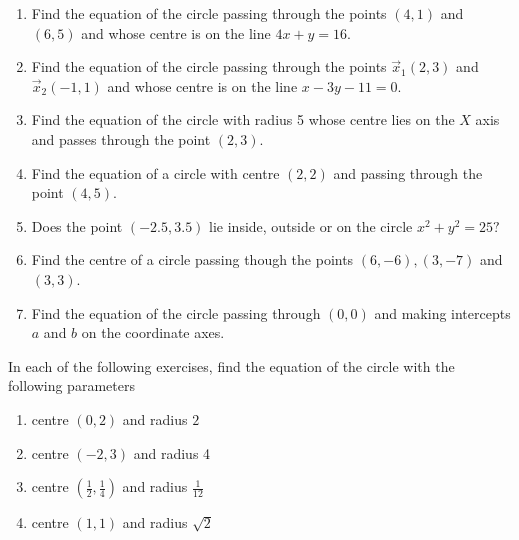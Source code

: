 \begin{enumerate}[label=\thesubsection.\arabic*, ref=\thesubsection.\theenumi]
  \item Find the equation of the circle passing through the points $(4, 1)$ and $(6, 5)$ and whose centre is on the line $ 4x+y=16. $
\label{chapters/11/11/1/10}
\\
\solution

  \item Find the equation of the circle passing through the points $\vec{x}_1(2, 3)$ and $\vec{x}_2(-1, 1)$ and whose centre is on the line $x-3y-11=0$.
\label{chapters/11/11/1/11}
\\
\solution 

  \item Find the equation of the circle with radius 5 whose centre lies on the $X$ axis and passes through the point $(2, 3)$.
\label{chapters/11/11/1/12}
\\
\solution 

  \item Find the equation of a circle with centre $(2, 2)$ and passing through the point $(4, 5)$.
\label{chapters/11/11/1/14}
\\
\solution

  \item Does the point $(-2.5, 3.5)$ lie inside,  outside or on the circle $x^{2}+y^{2}=25?$
\\
\solution

\item Find the centre of a circle passing though the points $(6, -6),  (3, -7)$ and $(3, 3)$. \\ 
\label{chapters/10/7/4/3}
\solution 

  \item Find the equation of the circle passing through $(0, 0)$ and making intercepts $a$ and $b$ on the coordinate axes.
\end{enumerate}
In each of the following exercises,  find the equation of the circle with the following parameters
\begin{enumerate}[label=\thesubsection.\arabic*, ref=\thesubsection.\theenumi, resume*]
 \item centre $(0, 2)$ and radius $2$
	 \\
		\solution
\label{chapters/11/11/1/1}

%
  \item centre $(-2, 3)$ and radius 4
	 \\
		\solution
\label{chapters/11/11/1/2}


  \item centre $\left(\frac{1}{2},  \frac{1}{4}\right)$ and radius $\frac{1}{12}$
\label{chapters/11/11/1/3}
	 \\
		\solution

  \item centre $(1, 1)$ and radius $\sqrt{2}$
	 \\
		\solution

\end{enumerate}
